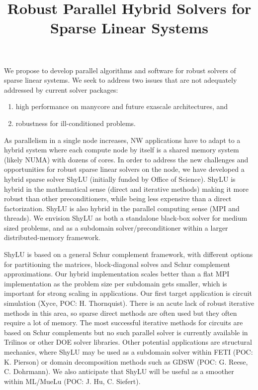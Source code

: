 \documentclass[10pt]{amsart}
\date{}
\title{Robust Parallel Hybrid Solvers for Sparse Linear Systems}
\begin{document}
\maketitle

We propose to develop parallel algorithms and software for robust solvers
of sparse linear systems. We seek to address two issues that
are not adequately addressed by current solver packages:
\begin{enumerate}
\item high performance on manycore and future exascale architectures, and
\item robustness for ill-conditioned problems.
\end{enumerate}

As parallelism in a single node increases, NW applications
have to adapt to a hybrid system where each compute node by itself
is a shared memory system (likely NUMA) with dozens of cores. 
In order to address the new challenges and opportunities 
for robust sparse linear solvers on the node,
we have developed a hybrid sparse solver ShyLU (initially funded by 
Office of Science). ShyLU is hybrid in the
mathematical sense (direct and iterative methods) making it more
robust than other preconditioners, while being less expensive
than a direct factorization.  ShyLU is also hybrid in the parallel
computing sense (MPI and threads). We envision ShyLU as both
a standalone black-box solver for medium sized problems,
and as a subdomain solver/preconditioner within a larger 
distributed-memory framework. 

ShyLU is based on a general Schur complement framework, with different options
for partitioning the matrices, block-diagonal solves and Schur complement
approximations.  Our hybrid implementation scales better than
a flat MPI implementation as the problem size per subdomain gets smaller, 
which is important for strong scaling in applications.
Our first target application is circuit simulation (Xyce, POC: H. Thornquist). 
There is an acute lack of robust iterative methods in this area, so sparse
direct methods are often used but they often require a lot of memory.
The most successful iterative methods
for circuits are based on Schur complements but no such parallel solver
is currently available in Trilinos or other DOE solver libraries.
%
Other potential applications are structural mechanics, where ShyLU
may be used as a subdomain solver within FETI (POC: K. Pierson) or
domain decomposition methods such as GDSW (POC: G. Reese, C. Dohrmann). 
We also anticipate that ShyLU
will be useful as a smoother within ML/MueLu (POC: J. Hu, C. Siefert).
\end{document}
